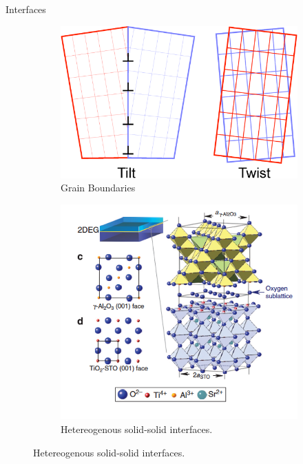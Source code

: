 \documentclass[aspectratio=169]{beamer}
\begin{document}
    \begin{frame}{Interfaces}
        \begin{figure}
            \centering
            \begin{subfigure}{0.45\textwidth}
                \centering
                \includegraphics[width=\linewidth]{lectures/figures/11_GBs.png}
                \caption{Grain Boundaries}
            \end{subfigure}
            \begin{subfigure}{0.45\textwidth}
                \centering
                \includegraphics[width=\linewidth]{lectures/figures/11_hetero_interfaces.png}
                \caption{Hetereogenous solid-solid interfaces.}
            \end{subfigure}
        \end{figure}
    \end{frame}
\end{document}
